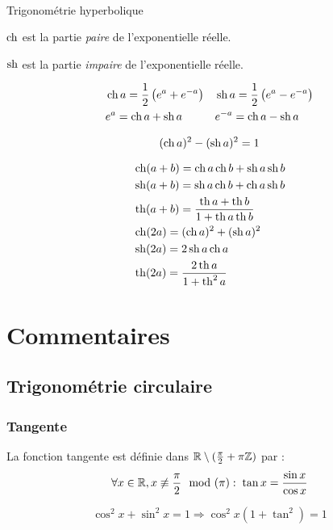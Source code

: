 \begin{center}
\hrulefill \\ 
 Trigonométrie hyperbolique
\end{center}

$\ch$ est la partie \emph{paire} de l'exponentielle réelle.

$\sh$ est la partie \emph{impaire} de l'exponentielle réelle.

\begin{align*}
 &\ch a = \frac{1}{2}\left( e^a + e^{-a}\right)  & & \sh a = \frac{1}{2}\left( e^a - e^{-a}\right) \\
 &e^{a} = \ch a + \sh a &  &e^{-a} = \ch a - \sh a
\end{align*}

\begin{displaymath}
 (\ch a)^2 - (\sh a)^2 = 1
\end{displaymath}

\begin{align*}
 &\ch(a+b) = \ch a \ch b  + \sh a \sh b\\
 &\sh(a+b) = \sh a \ch b + \ch a \sh b \\
 &\th(a+b) = \frac{\th a + \th b}{1+\th a \th b}\\
 &\ch(2a) = (\ch a)^2 + (\sh a)^2 \\
 &\sh(2a) = 2\sh a \ch a \\
 &\th(2a) = \frac{2\th a }{1+\th^2 a}
\end{align*}
\onecolumn

\section{Commentaires}
\subsection{Trigonométrie circulaire}
\subsubsection{Tangente}
\begin{defi} 
  La fonction tangente est définie dans $\R \setminus (\frac{\pi}{2} +\pi\Z)$ par :
  \begin{displaymath}
    \forall x \in \R, x \not\equiv \frac{\pi}{2} \mod(\pi): \; \tan x = \frac{\sin x}{\cos x} 
  \end{displaymath}
\end{defi}
\begin{displaymath}
  \cos^2 x + \sin^2 x = 1 \Rightarrow \cos^2 x\left( 1+ \tan^2\right) = 1 
\end{displaymath}

